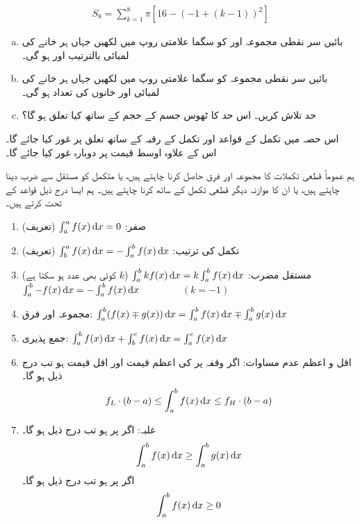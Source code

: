 \begin{align*}
S_8=\sum\limits_{k=1}^{8}\pi[16-(-1+(k-1))^2]
\end{align*}
\begin{enumerate}[a.]
\item
بائیں سر نقطی مجموعہ  اور  کو سگما علامتی روپ میں لکھیں جہاں ہر خانے کی لمبائی بالترتیب  اور  ہو گی۔
\item
بائیں سر نقطی مجموعہ   کو سگما علامتی روپ میں لکھیں جہاں ہر خانے کی لمبائی  اور خانوں کی تعداد  ہو گی۔
\item
حد  تلاش کریں۔ اس حد کا ٹھوس جسم کے حجم کے ساتھ کیا تعلق ہو گا؟
\end{enumerate}



اس حصہ میں تکمل کے قواعد اور تکمل کے  رقبہ کے ساتھ تعلق پر غور کیا جائے گا۔ اس کے علاوہ اوسط قیمت پر دوبارہ غور کیا جائے گا۔

ہم عموماً قطعی تکملات کا مجموعہ اور فرق حاصل کرنا چاہتے ہیں، یا متکمل کو مستقل سے ضرب دینا چاہتے ہیں، یا ان کا موازنہ دیگر قطعی تکمل کے ساتھ کرنا چاہتے ہیں۔ ہم ایسا درج ذیل قواعد کے تحت کرتے ہیں۔

\begin{enumerate}[1.]
\item
صفر: \quad
$\int_a^af(x)\dif x=0$ \quad
(تعریف)
\item
تکمل کی ترتیب:\quad
$\int_b^af(x)\dif x=-\int_a^bf(x)\dif x$\quad
(تعریف)
\item
مستقل مضرب:\quad
$\int_a^bkf(x)\dif x=k\int_a^bf(x)\dif x$\quad
($k$ کوئی بھی عدد ہو سکتا ہے)\\
$\int_a^b-f(x)\dif x=-\int_a^bf(x)\dif x\quad\quad\quad\quad$\quad
$(k=-1)$
\item
مجموعہ اور فرق:\quad
$\int_a^b(f(x)\mp g(x))\dif x=\int_a^bf(x)\dif x\mp \int_a^bg(x)\dif x$
\item
جمع پذیری:\quad
$\int_a^bf(x)\dif x+\int_b^cf(x)\dif x=\int_a^cf(x)\dif x$
\item
اقل و اعظم عدم مساوات:\quad
 اگر وقفہ  پر  کی اعظم  قیمت  اور اقل قیمت  ہو تب درج ذیل ہو گا۔
\begin{align*}
f_L\cdot (b-a)\le \int_a^b f(x)\dif x\le f_H\cdot (b-a)
\end{align*}
\item
غلبہ:\quad
اگر  پر  ہو تب  درج ذیل ہو گا۔
\begin{align*}
\int_a^bf(x)\dif x\ge \int_a^bg(x)\dif x
\end{align*}
اگر  پر  ہو تب درج ذیل ہو گا۔
\begin{align*}
\int_a^bf(x)\dif x\ge 0
\end{align*}
\end{enumerate}

